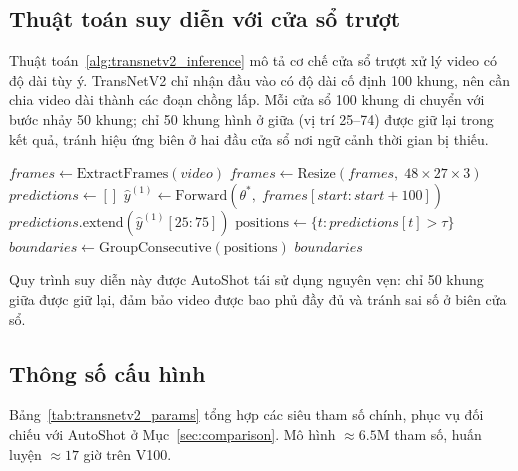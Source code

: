 \subsection{Thuật toán suy diễn với cửa sổ trượt}
\label{subsec:transnetv2_algorithms}

Thuật toán~\ref{alg:transnetv2_inference} mô tả cơ chế cửa sổ trượt xử lý video có độ dài tùy ý. TransNetV2 chỉ nhận đầu vào có độ dài cố định 100 khung, nên cần chia video dài thành các đoạn chồng lấp. Mỗi cửa sổ 100 khung di chuyển với bước nhảy 50 khung; chỉ 50 khung hình ở giữa (vị trí 25–74) được giữ lại trong kết quả, tránh hiệu ứng biên ở hai đầu cửa sổ nơi ngữ cảnh thời gian bị thiếu.

\begin{algorithm}[H]
\caption{TransNetV2 Inference}
\label{alg:transnetv2_inference}
\begin{algorithmic}[1]
    \State $frames \gets \text{ExtractFrames}(video)$
    \State $frames \gets \text{Resize}(frames,\; 48 \times 27 \times 3)$
    \State $predictions \gets []$
        \State $\hat{y}^{(1)} \gets \text{Forward}(\theta^*,\; frames[start : start+100])$
        \State $predictions.\text{extend}(\hat{y}^{(1)}[25:75])$
    \EndFor
    \State $\text{positions} \gets \{t : predictions[t] > \tau\}$
    \State $boundaries \gets \text{GroupConsecutive}(\text{positions})$
    \State \Return $boundaries$
\EndFunction
\end{algorithmic}
\end{algorithm}

Quy trình suy diễn này được AutoShot tái sử dụng nguyên vẹn: chỉ 50 khung giữa được giữ lại, đảm bảo video được bao phủ đầy đủ và tránh sai số ở biên cửa sổ.

\subsection{Thông số cấu hình}
\label{subsec:transnetv2_complexity}

Bảng~\ref{tab:transnetv2_params} tổng hợp các siêu tham số chính, phục vụ đối chiếu với AutoShot ở Mục~\ref{sec:comparison}. Mô hình $\approx6.5$M tham số, huấn luyện $\approx17$ giờ trên V100.

